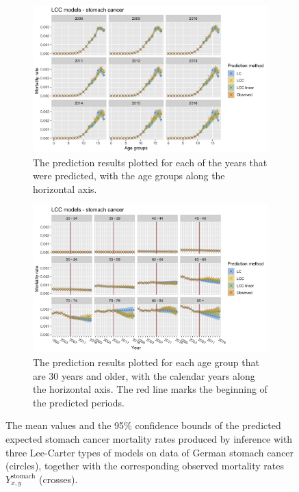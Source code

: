 \begin{figure}[h!]
    \centering
    \begin{subfigure}[b]{.75\linewidth}
        \includegraphics[width=\linewidth]{real-data/real-data-univariate/Figures/univariate-LCC-by-age-stomach.png}
        \caption{The prediction results plotted for each of the years that were predicted, with the age groups along the horizontal axis.}
        \label{fig:uv-LCC-stomach-top}
    \end{subfigure}
    
    \begin{subfigure}[b]{.75\linewidth}
        \includegraphics[width=\linewidth]{real-data/real-data-univariate/Figures/univariate-LCC-by-period-stomach.png}
        \caption{The prediction results plotted for each age group that are 30 years and older, with the calendar years along the horizontal axis. The red line marks the beginning of the predicted periods.}
        \label{fig:uv-LCC-stomach-bottom}
    \end{subfigure}
    \caption{The mean values and the 95\% confidence bounds of the predicted expected stomach cancer mortality rates produced by inference with three Lee-Carter types of models on data of German stomach cancer (circles), together with the corresponding observed mortality rates $Y_{x,y}^{\text{stomach}}$ (crosses).}
    \label{fig:uv-LCC-stomach}
\end{figure}

